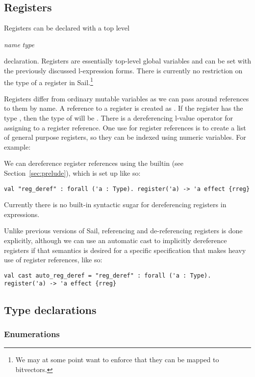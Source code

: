 \subsection{Registers}

Registers can be declared with a top level
\begin{center}
   \textit{name} \ll{:} \textit{type}
\end{center}
declaration. Registers are essentially top-level global variables and
can be set with the previously discussed l-expression forms. There is
currently no restriction on the type of a register in
Sail.\footnote{We may at some point want to enforce that they can be
  mapped to bitvectors.}

Registers differ from ordinary mutable variables as we can pass around
references to them by name. A reference to a register  is
created as . If the register  has the type ,
then the type of  will be . There is a
dereferencing l-value operator \ll{*} for assigning to a register
reference. One use for register references is to create a list of
general purpose registers, so they can be indexed using numeric
variables. For example:


We can dereference register references using the 
builtin (see Section~\ref{sec:prelude}), which is set up like so:
\begin{lstlisting}
val "reg_deref" : forall ('a : Type). register('a) -> 'a effect {rreg}
\end{lstlisting}
Currently there is no built-in syntactic sugar for dereferencing
registers in expressions.

Unlike previous versions of Sail, referencing and de-referencing
registers is done explicitly, although we can use an automatic cast to
implicitly dereference registers if that semantics is desired for a
specific specification that makes heavy use of register references,
like so:
\begin{lstlisting}
val cast auto_reg_deref = "reg_deref" : forall ('a : Type). register('a) -> 'a effect {rreg}
\end{lstlisting}


\subsection{Type declarations}

\subsubsection{Enumerations}


